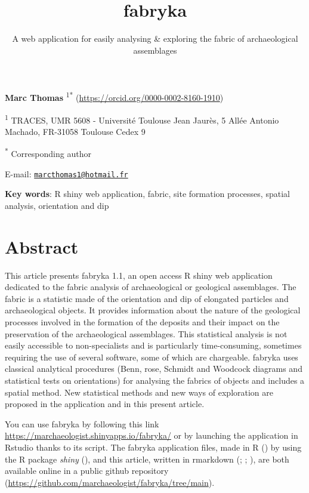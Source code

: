 \documentclass[
]{article}
\title{\hfill\break
\textbf{fabryka}}
\subtitle{A web application for easily analysing \& exploring the fabric
of archaeological assemblages}
\author{}
\date{\vspace{-2.5em}}
\begin{document}
\maketitle

\renewcommand{\[}{\begin{equation}}
\renewcommand{\]}{\end{equation}}

\textbf{Marc Thomas} \textsuperscript{1*}
(\url{https://orcid.org/0000-0002-8160-1910}) \smallbreak

\textsuperscript{1} TRACES, UMR 5608 - Université Toulouse Jean Jaurès,
5 Allée Antonio Machado, FR-31058 Toulouse Cedex 9 \smallbreak

\textsuperscript{*} Corresponding author \smallbreak

E-mail:
\href{mailto:marcthomas1@hotmail.fr}{\nolinkurl{marcthomas1@hotmail.fr}}
\smallbreak

\textbf{Key words}: R shiny web application, fabric, site formation
processes, spatial analysis, orientation and dip \bigbreak

\section{Abstract}\label{abstract}

This article presents fabryka 1.1, an open access R shiny web
application dedicated to the fabric analysis of archaeological or
geological assemblages. The fabric is a statistic made of the
orientation and dip of elongated particles and archaeological objects.
It provides information about the nature of the geological processes
involved in the formation of the deposits and their impact on the
preservation of the archaeological assemblages. This statistical
analysis is not easily accessible to non-specialists and is particularly
time-consuming, sometimes requiring the use of several software, some of
which are chargeable. fabryka uses classical analytical procedures
(Benn, rose, Schmidt and Woodcock diagrams and statistical tests on
orientations) for analysing the fabrics of objects and includes a
spatial method. New statistical methods and new ways of exploration are
proposed in the application and in this present article.\smallbreak

You can use fabryka by following this link
\url{https://marchaeologist.shinyapps.io/fabryka/} or by launching the
application in Rstudio thanks to its script. The fabryka application
files, made in R () by using the
R package \emph{shiny} (),
and this article, written in rmarkdown
(;
;
), are both
available online in a public github repository
(\url{https://github.com/marchaeologist/fabryka/tree/main}). \pagebreak
\end{document}
